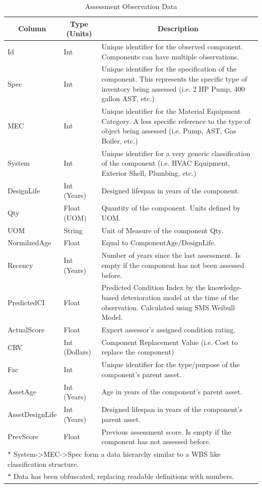 \documentclass[NewProceedings,letterpaper,NoPageNumbers]{ascelike-new}
\begin{document}
\begin{table}
\caption{Assessment Observation Data}
\label{table:assembly}
\centering
\small
\renewcommand{\arraystretch}{1.25}
\begin{tabular}{l l p{3.2in}}
\hline\hline
\multicolumn{1}{c}{Column} &
\multicolumn{1}{c}{Type (Units)} &
\multicolumn{1}{c}{Description} \\
\hline
Id & Int & Unique identifier for the observed component. Components can have multiple observations.\\
Spec & Int & Unique identifier for the specification of the component. This represents the specific type of inventory being assessed (i.e. 2 HP Pump, 400 gallon AST, etc.) \\
MEC & Int & Unique identifier for the Material Equipment Category. A less specific reference to the type of object being assessed (i.e. Pump, AST, Gas Boiler, etc.) \\
System & Int & Unique identifier for a very generic classification of the component (i.e. HVAC Equipment, Exterior Shell, Plumbing, etc.) \\
DesignLife & Int (Years) & Designed lifespan in years of the component. \\
Qty & Float (UOM) & Quantity of the component. Units defined by UOM. \\
UOM & String & Unit of Measure of the component Qty. \\
NormilzedAge & Float & Equal to $\text{ComponentAge} / \text{DesignLife}$. \\
Recency & Int (Years) & Number of years since the last assessment. Is empty if the component has not been assessed before. \\
PredictedCI & Float & Predicted Condition Index by the knowledge-based deterioration model at the time of the observation. Calculated using SMS Weibull Model. \\
ActualScore & Float & Expert assessor's assigned condition rating. \\
CRV & Int (Dollars) & Component Replacement Value (i.e. Cost to replace the component) \\
Fac & Int & Unique identifier for the type/purpose of the component's parent asset. \\
AssetAge & Int (Years) & Age in years of the component's parent asset. \\
AssetDesignLife & Int (Years) & Designed lifespan in years of the component's parent asset. \\
PrevScore & Float & Previous assessment score. Is empty if the component has not assessed before. \\
\hline
\multicolumn{3}{l}{$\ast$ System->MEC->Spec form a data hierarchy similar to a WBS like classification structure.} \\
\multicolumn{3}{l}{$\ast$ Data has been obfuscated, replacing readable definitions with numbers.} \\
\hline\hline
\end{tabular}
\normalsize
\end{table}
\end{document}
